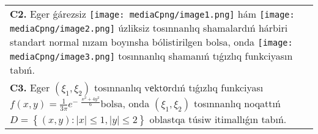 \documentclass{article}
\begin{document}
\begin{tabular}{m{17cm}}
 \\
\textbf{C2.} 
Eger ǵárezsiz \texttt{[image: mediaCpng/image1.png]} hám \texttt{[image: mediaCpng/image2.png]} úzliksiz tosınnanlıq shamalardıń hárbiri standart normal nızam boyınsha bólistirilgen bolsa, onda \texttt{[image: mediaCpng/image3.png]} tosınnanlıq shamanıń tıǵızlıq funkciyasın tabıń.
 \\
\textbf{C3.} Eger \(\left( \xi_{1},\xi_{2} \right)\) tosınnanlıq vеktоrdıń tıǵızlıq funkciyası \(f(x,y) = \frac{1}{3\pi}e^{- \ \ \frac{x^{2} + 4y^{2}}{6}}\)bolsa, onda \(\left( \xi_{1},\xi_{2} \right)\) tosınnanlıq noqattıń \(D = \left\{ (x,y):|x| \leq 1,|y| \leq 2 \right\}\) oblastqa túsiw itimallıǵın tabıń.
 \\

\end{tabular}
\vspace{1cm}
\end{document}
